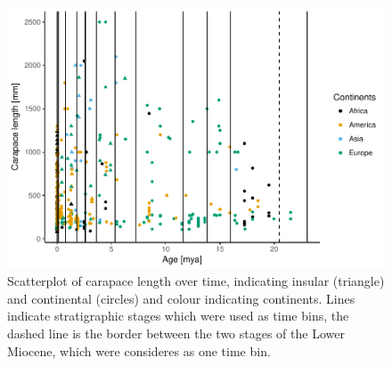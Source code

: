 \begin{figure}[htbp]
	\centering
	\includegraphics{MA_JJ_files/figure-latex/overviewData-1.pdf}
	\caption{Scatterplot of carapace length over time, indicating insular
		(triangle) and continental (circles) and colour indicating continents.
		Lines indicate stratigraphic stages which were used as time bins, the
		dashed line is the border between the two stages of the Lower Miocene,
		which were consideres as one time bin.}
	\label{fig:bins}
\end{figure}
